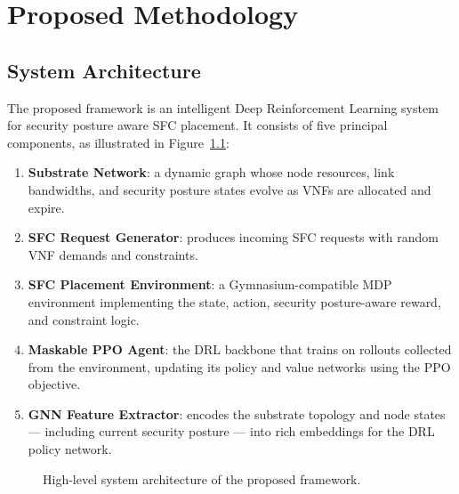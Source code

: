 \chapter{Proposed Methodology}

\section{System Architecture}

The proposed framework is an intelligent Deep Reinforcement Learning system for security posture aware SFC placement. It consists of five principal components, as illustrated in Figure~\ref{fig:architecture}:

\begin{enumerate}
  \item \textbf{Substrate Network}: a dynamic graph whose node resources, link bandwidths, and security posture states evolve as VNFs are allocated and expire.
  \item \textbf{SFC Request Generator}: produces incoming SFC requests with random VNF demands and constraints.
  \item \textbf{SFC Placement Environment}: a Gymnasium-compatible MDP environment implementing the state, action, security posture-aware reward, and constraint logic.
  \item \textbf{Maskable PPO Agent}: the DRL backbone that trains on rollouts collected from the environment, updating its policy and value networks using the PPO objective.
  \item \textbf{GNN Feature Extractor}: encodes the substrate topology and node states — including current security posture — into rich embeddings for the DRL policy network.
\end{enumerate}

\begin{figure}[!ht]
\centering
{}
\caption{High-level system architecture of the proposed framework.}
\label{fig:architecture}
\end{figure}

